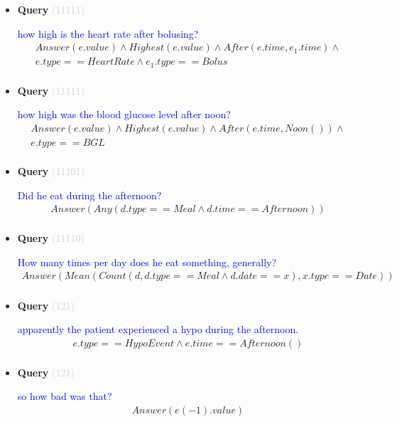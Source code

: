 \documentclass[11pt]{article}
\newcommand{\key}[1]{\textcolor{lightgray}{#1}}
\newcounter{CQuery}
\begin{document}
\begin{itemize}
\item
\textbf{Query\theCQuery} \key{(11111)} \addtocounter{CQuery}{1}
\textcolor{blue}{ how high is the heart rate after bolusing? }
\begin{multline*}
Answer(e.value) \wedge Highest(e.value) \wedge After(e.time, e_1.time) \wedge \\ 
e.type==HeartRate \wedge e_1.type==Bolus \\ 
\end{multline*}


\item
\textbf{Query\theCQuery} \key{(11111)} \addtocounter{CQuery}{1}
\textcolor{blue}{ how high was the blood glucose level after noon? }
\begin{multline*}
Answer(e.value) \wedge Highest(e.value) \wedge After(e.time, Noon()) \wedge \\ 
e.type==BGL \\ 
\end{multline*}


\item
\textbf{Query\theCQuery} \key{(11101)} \addtocounter{CQuery}{1}
\textcolor{blue}{ Did he eat during the afternoon? }
\begin{multline*}
Answer(Any(d.type==Meal \wedge d.time==Afternoon)) \\ 
\end{multline*}


\item
\textbf{Query\theCQuery} \key{(11110)} \addtocounter{CQuery}{1}
\textcolor{blue}{ How many times per day does he eat something, generally? }
\begin{multline*}
Answer(Mean(Count(d, d.type==Meal \wedge d.date==x), x.type==Date)) \\ 
\end{multline*}


\item
\textbf{Query\theCQuery} \key{(121)} \addtocounter{CQuery}{1}
\textcolor{blue}{ apparently the patient experienced a hypo during the afternoon. }
\begin{multline*}
e.type==HypoEvent \wedge e.time==Afternoon() \\ 
\end{multline*}


\item
\textbf{Query\theCQuery} \key{(121)} \addtocounter{CQuery}{1}
\textcolor{blue}{ so how bad was that? }
\begin{multline*}
Answer(e(-1).value) \\ 
\end{multline*}



\end{itemize}
\end{document}

